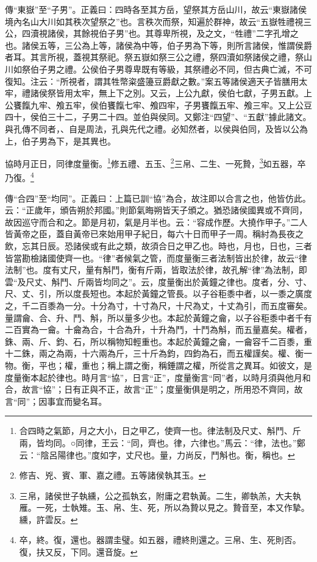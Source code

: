 {\noindent\zhuan{}\fzbyks 傳“東嶽”至“子男”。正義曰：四時各至其方岳，望祭其方岳山川，故云“東嶽諸侯境內名山大川如其秩次望祭之”也。言秩次而祭，知遍於群神，故云“五嶽牲禮視三公，四瀆視諸侯，其餘視伯子男”也。其尊卑所視，及之文，“牲禮”二字孔增之也。諸侯五等，三公為上等，諸侯為中等，伯子男為下等，則所言諸侯，惟謂侯爵者耳。其言所視，蓋視其祭祀。祭五嶽如祭三公之禮，祭四瀆如祭諸侯之禮，祭山川如祭伯子男之禮。公侯伯子男尊卑既有等級，其祭禮必不同，但古典亡滅，不可復知。注云：“所視者，謂其牲幣粢盛籩豆爵獻之數。”案五等諸侯適天子皆膳用太牢，禮諸侯祭皆用太牢，無上下之別。又云，上公九獻，侯伯七獻，子男五獻。上公饔餼九牢、飧五牢，侯伯饔餼七牢、飧四牢，子男饔餼五牢、飧三牢。又上公豆四十，侯伯三十二，子男二十四。並伯與侯同。又鄭注“四望”、“五獻”據此諸文。與孔傳不同者，、自是周法，孔與先代之禮。必知然者，以侯與伯同，及皆以公為上，伯子男為下，是其異也。 \par}

協時月正日，同律度量衡。\footnote{合四時之氣節，月之大小，日之甲乙，使齊一也。律法制及尺丈、斛鬥、斤兩，皆均同。○同律，王云：“同，齊也。律，六律也。”馬云：“律，法也。”鄭云：“陰呂陽律也。”度如字，丈尺也。量，力尚反，鬥斛也。衡，稱也。}修五禮、五玉、\footnote{修吉、兇、賓、軍、嘉之禮。五等諸侯執其玉。}三帛、二生、一死贄，\footnote{三帛，諸侯世子執纁，公之孤執玄，附庸之君執黃。二生，卿執羔，大夫執雁。一死，士執雉。玉、帛、生、死，所以為贄以見之。贄音至，本又作摯。纁，許雲反。}如五器，卒乃復。\footnote{卒，終。復，還也。器謂圭璧。如五器，禮終則還之。三帛、生、死則否。復，扶又反，下同。還音旋。}

{\noindent\zhuan{}\fzbyks 傳“合四”至“均同”。正義曰：上篇已訓“協”為合，故注即以合言之也，他皆仿此。云：“正歲年，頒告朔於邦國。”則節氣晦朔皆天子頒之。猶恐諸侯國異或不齊同，故因巡守而合和之。節是月初，氣是月半也。云：“容成作歷。大撓作甲子。”二人皆黃帝之臣，蓋自黃帝已來始用甲子紀日，每六十日而甲子一周。稱紂為長夜之飲，忘其日辰。恐諸侯或有此之類，故須合日之甲乙也。時也，月也，日也，三者皆當勘檢諸國使齊一也。“律”者候氣之管，而度量衡三者法制皆出於律，故云“律法制”也。度有丈尺，量有斛鬥，衡有斤兩，皆取法於律，故孔解“律”為法制，即雲“及尺丈、斛鬥、斤兩皆均同之”。云，度量衡出於黃鐘之律也。度者，分、寸、尺、丈、引，所以度長短也。本起於黃鐘之管長。以子谷秬黍中者，以一黍之廣度之，千二百黍為一分。十分為寸，十寸為尺，十尺為丈，十丈為引，而五度審矣。量謂龠、合、升、鬥、斛，所以量多少也。本起於黃鐘之龠，以子谷秬黍中者千有二百實為一龠。十龠為合，十合為升，十升為鬥，十鬥為斛，而五量嘉矣。權者，銖、兩、斤、鈞、石，所以稱物知輕重也。本起於黃鐘之龠，一龠容千二百黍，重十二銖，兩之為兩，十六兩為斤，三十斤為鈞，四鈞為石，而五權謹矣。權、衡一物。衡，平也；權，重也；稱上謂之衡，稱錘謂之權，所從言之異耳。如彼文，是度量衡本起於律也。時月言“協”，日言“正”，度量衡言“同”者，以時月須與他月和合，故言“協”；日有正與不正，故言“正”；度量衡俱是明之，所用恐不齊同，故言“同”；因事宜而變名耳。 \par}

